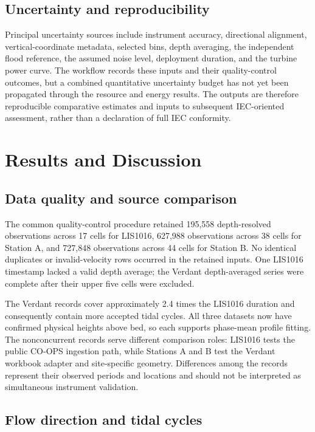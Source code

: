 \documentclass[12pt,sort&compress]{elsarticle}
\begin{document}
\subsection{Uncertainty and reproducibility}
\label{subsec:uncertainty}

Principal uncertainty sources include instrument accuracy, directional alignment, vertical-coordinate metadata, selected bins, depth averaging, the independent flood reference, the assumed noise level, deployment duration, and the turbine power curve. The workflow records these inputs and their quality-control outcomes, but a combined quantitative uncertainty budget has not yet been propagated through the resource and energy results. The outputs are therefore reproducible comparative estimates and inputs to subsequent IEC-oriented assessment, rather than a declaration of full IEC conformity.

\section{Results and Discussion}
\label{sec:results}

\subsection{Data quality and source comparison}
\label{subsec:data-quality-results}

The common quality-control procedure retained 195,558 depth-resolved observations across 17 cells for LIS1016, 627,988 observations across 38 cells for Station A, and 727,848 observations across 44 cells for Station B. No identical duplicates or invalid-velocity rows occurred in the retained inputs. One LIS1016 timestamp lacked a valid depth average; the Verdant depth-averaged series were complete after their upper five cells were excluded.

The Verdant records cover approximately 2.4 times the LIS1016 duration and consequently contain more accepted tidal cycles. All three datasets now have confirmed physical heights above bed, so each supports phase-mean profile fitting. The nonconcurrent records serve different comparison roles: LIS1016 tests the public CO-OPS ingestion path, while Stations A and B test the Verdant workbook adapter and site-specific geometry. Differences among the records represent their observed periods and locations and should not be interpreted as simultaneous instrument validation.

\subsection{Flow direction and tidal cycles}
\label{subsec:flow-results}
\end{document}
